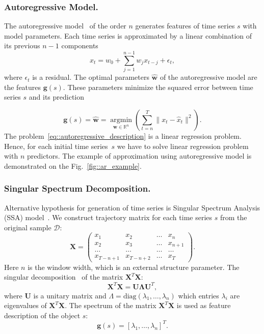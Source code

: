 \documentclass[a4paper,12pt]{article}
\newcommand{\argmin}{\mathop{\arg \min}\limits}
\begin{document}
\subsubsection{Autoregressive Model.}
The autoregressive model~\cite{lukashin2003adaptive} of the order $n$ generates features of time series $s$ with model parameters. 
Each time series is approximated by a linear combination of its previous $n-1$ components 
\begin{equation*}
x_t = w_0 + \sum_{j=1}^{n-1} w_j x_{t-j} + \epsilon_t,
\end{equation*}
where $\epsilon_t$ is a residual. 
The optimal parameters $\hat{\boldsymbol{w}}$ of the autoregressive model are the features $\boldsymbol{g}(s)$.
These parameters minimize the squared error between time series $s$ and its prediction

\begin{equation}
\boldsymbol{g}(s) = \hat{\boldsymbol{w}} = \argmin_{\boldsymbol{w} \in \mathbb{R}^{n}} \left( \sum_{t=n}^{T} \|x_t - \hat{x}_t\|^2\right).
\label{eq::autoregressive_description}
\end{equation}
The problem~\eqref{eq::autoregressive_description} is a linear regression problem. Hence, for each initial time series~$s$ we have to solve linear regression problem with $n$ predictors.
The example of approximation using autoregressive model is demonstrated on the Fig.~\ref{fig::ar_example}.

\subsubsection{Singular Spectrum Decomposition.}
Alternative hypothesis for generation of time series is Singular Spectrum Analysis (SSA) model~\cite{hassani2007singular}. We construct trajectory matrix for each time series $s$ from the original sample $\mathcal{D}$:
\[
\mathbf{X} = 
\begin{pmatrix}
x_1 & x_2 & \dots & x_n \\
x_2 & x_3 & \dots & x_{n+1} \\
\dots & \dots & \dots & \dots \\
x_{T-n+1} & x_{T-n+2} & \dots & x_T
\end{pmatrix}.
\]
Here $n$ is the window width, which is an external structure parameter.
The singular decomposition~\cite{golub1970singular} of the matrix $\mathbf{X}^{T} \mathbf{X}$:
\[
\mathbf{X}^{T} \mathbf{X} = \mathbf{U} \mathbf{\Lambda} \mathbf{U}^{T},
\]
where $\mathbf{U}$ is a unitary matrix and $\Lambda = \mathrm{diag}(\lambda_1, \dots, \lambda_n)$ which entries $\lambda_i$ are eigenvalues of $\mathbf{X}^{T} \mathbf{X}$. 
The spectrum of the matrix $\mathbf{X}^{T} \mathbf{X}$ is used as feature description of the object $s$:
\[
\boldsymbol{g}(s) = \left[\lambda_1, \dots, \lambda_n\right]^{T}.
\]
\end{document}
